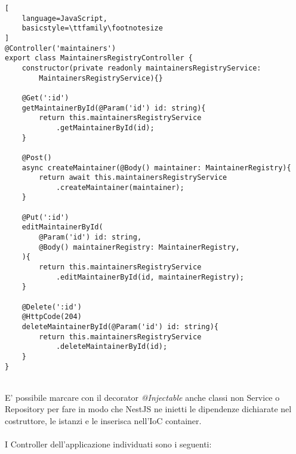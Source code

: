 \begin{lstlisting}[
    language=JavaScript,
    basicstyle=\ttfamily\footnotesize
]
@Controller('maintainers')
export class MaintainersRegistryController {
    constructor(private readonly maintainersRegistryService: 
        MaintainersRegistryService){}

    @Get(':id')
    getMaintainerById(@Param('id') id: string){
        return this.maintainersRegistryService
            .getMaintainerById(id);
    }

    @Post()
    async createMaintainer(@Body() maintainer: MaintainerRegistry){
        return await this.maintainersRegistryService
            .createMaintainer(maintainer);
    }

    @Put(':id')
    editMaintainerById(
        @Param('id') id: string,
        @Body() maintainerRegistry: MaintainerRegistry,
    ){
        return this.maintainersRegistryService
            .editMaintainerById(id, maintainerRegistry);
    }

    @Delete(':id')
    @HttpCode(204)
    deleteMaintainerById(@Param('id') id: string){
        return this.maintainersRegistryService
            .deleteMaintainerById(id);
    }
}
\end{lstlisting}
\leavevmode\newline
\\
E' possibile marcare con il decorator \textit{@Injectable}
anche classi non Service o Repository per fare in modo che NestJS ne inietti le dipendenze 
dichiarate nel costruttore, le istanzi e le inserisca nell'IoC container.
\\\\
I Controller dell'applicazione individuati sono i seguenti:
